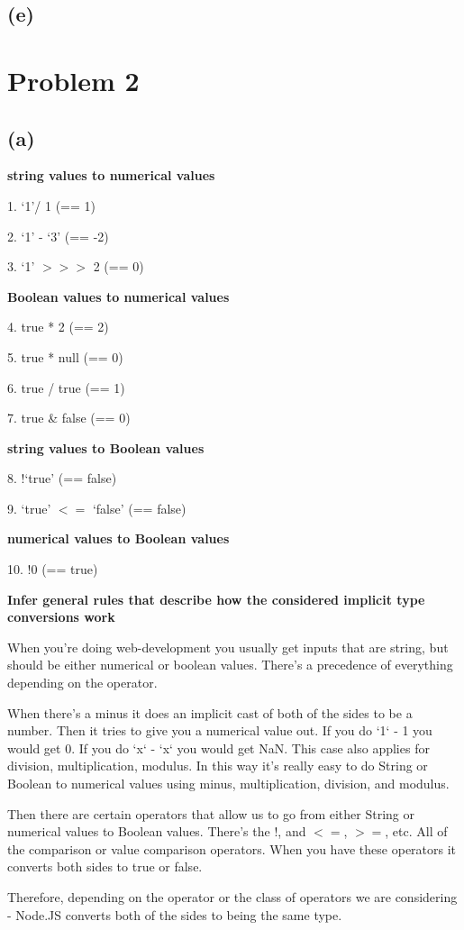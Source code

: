 \documentclass[11pt, oneside]{article}
\newcommand{\forceindent}{\leavevmode{\parindent=1.5em\indent}}
\begin{document}
\subsection*{(e)}
\par 

\section{Problem 2}
\subsection*{(a)}
\forceindent \par \textbf{string values to numerical values}
\par 1. `1'/ 1 (== 1)
\par 2. `1' - `3' (== -2)
\par 3. `1' $>>>$ 2 (== 0)
\par \textbf{Boolean values to numerical values}
\par 4. true * 2 (== 2)
\par 5. true * null (== 0)
\par 6. true / true (== 1)
\par 7. true \& false (== 0)
\par \textbf{string values to Boolean values}
\par 8. $!$`true' (== false)
\par 9. `true' $<=$ `false' (== false)
\par \textbf{numerical values to Boolean values}
\par 10. $!$0 (== true)
\par \textbf{Infer general rules that describe how the considered implicit type conversions work}
\par When you're doing web-development you usually get inputs that are string, but should be either numerical or boolean values. There's a precedence of everything depending on the operator. 
\par When there's a minus it does an implicit cast of both of the sides to be a number. Then it tries to give you a numerical value out. If you do `1` - 1 you would get 0. If you do `x` - `x` you would get NaN. This case also applies for division, multiplication, modulus. In this way it's really easy to do String or Boolean to numerical values using minus, multiplication, division, and modulus.
\par Then there are certain operators that allow us to go from either String or numerical values to Boolean values. There's the $!$, and $<=$, $>=$, etc. All of the comparison or value comparison operators. When you have these operators it converts both sides to true or false.
\par Therefore, depending on the operator or the class of operators we are considering - Node.JS converts both of the sides to being the same type.
\end{document}
